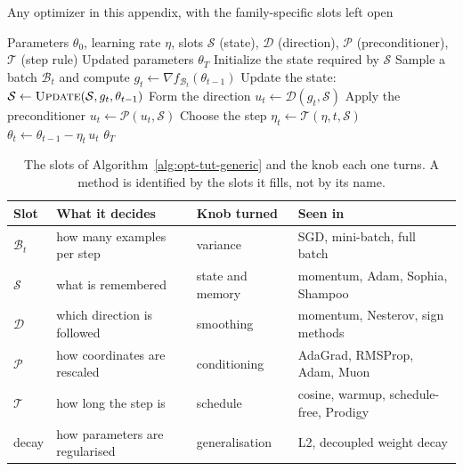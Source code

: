 \begin{algorithm}[H]
\caption{Any optimizer in this appendix, with the family-specific slots left open}
\label{alg:opt-tut-generic}
\begin{algorithmic}[1]
\Require Parameters $\theta_0$, learning rate $\eta$, slots
$\mathcal{S}$ (state), $\mathcal{D}$ (direction), $\mathcal{P}$ (preconditioner), $\mathcal{T}$ (step rule)
\Ensure Updated parameters $\theta_T$
\State Initialize the state required by $\mathcal{S}$
    \State Sample a batch $\mathcal{B}_t$ and compute $g_t\gets\nabla f_{\mathcal{B}_t}(\theta_{t-1})$ 
    \State Update the state: $\mathcal{S}\gets\textsc{Update}(\mathcal{S}, g_t, \theta_{t-1})$ 
    \State Form the direction $u_t\gets\mathcal{D}(g_t,\mathcal{S})$ 
    \State Apply the preconditioner $u_t\gets\mathcal{P}(u_t,\mathcal{S})$ 
    \State Choose the step $\eta_t\gets\mathcal{T}(\eta, t, \mathcal{S})$ 
    \State $\theta_t\gets\theta_{t-1}-\eta_t\,u_t$ 
\EndFor
\State \Return $\theta_T$
\end{algorithmic}
\end{algorithm}

\begin{table}[H]
\centering
\caption{The slots of Algorithm~\ref{alg:opt-tut-generic} and the knob each one
turns. A method is identified by the slots it fills, not by its name.}
\label{tab:opt-tut-knobs}
\small
\begin{tabular}{@{}L{2.4cm}L{4.4cm}L{3.4cm}L{3.6cm}@{}}
\toprule
Slot & What it decides & Knob turned & Seen in \\
\midrule
$\mathcal{B}_t$ & how many examples per step & variance & SGD, mini-batch, full batch \\
$\mathcal{S}$ & what is remembered & state and memory & momentum, Adam, Sophia, Shampoo \\
$\mathcal{D}$ & which direction is followed & smoothing & momentum, Nesterov, sign methods \\
$\mathcal{P}$ & how coordinates are rescaled & conditioning & AdaGrad, RMSProp, Adam, Muon \\
$\mathcal{T}$ & how long the step is & schedule & cosine, warmup, schedule-free, Prodigy \\
decay & how parameters are regularised & generalisation & L2, decoupled weight decay \\
\bottomrule
\end{tabular}
\end{table}

